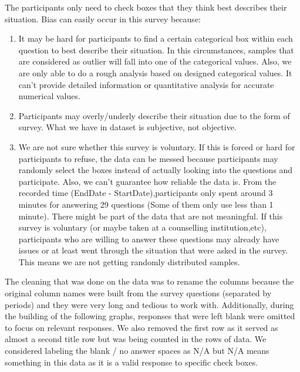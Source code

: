 \documentclass[
]{article}
\begin{document}
The participants only need to check boxes that they think best describes
their situation. Bias can easily occur in this survey because:

\begin{enumerate}
\def\labelenumi{\arabic{enumi}.}
\item
  It may be hard for participants to find a certain categorical box
  within each question to best describe their situation. In this
  circumstances, samples that are considered as outlier will fall into
  one of the categorical values. Also, we are only able to do a rough
  analysis based on designed categorical values. It can't provide
  detailed information or quantitative analysis for accurate numerical
  values.
\item
  Participants may overly/underly describe their situation due to the
  form of survey. What we have in dataset is subjective, not objective.
\item
  We are not sure whether this survey is voluntary. If this is forced or
  hard for participants to refuse, the data can be messed because
  participants may randomly select the boxes instead of actually looking
  into the questions and participate. Also, we can't guarantee how
  reliable the data is. From the recorded time (EndDate -
  StartDate),participants only spent around 3 minutes for answering 29
  questions (Some of them only use less than 1 minute). There might be
  part of the data that are not meaningful. If this survey is voluntary
  (or maybe taken at a counselling institution,etc), participants who
  are willing to answer these questions may already have issues or at
  least went through the situation that were asked in the survey. This
  means we are not getting randomly distributed samples.
\end{enumerate}

The cleaning that was done on the data was to rename the columns because
the original column names were built from the survey questions
(separated by periods) and they were very long and tedious to work with.
Additionally, during the building of the following graphs, responses
that were left blank were omitted to focus on relevant responses. We
also removed the first row as it served as almost a second title row but
was being counted in the rows of data. We considered labeling the blank
/ no answer spaces as N/A but N/A means something in this data as it is
a valid response to specific check boxes.
\end{document}
